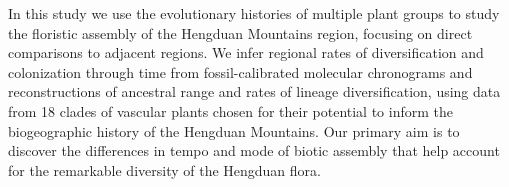 



In this study we use the evolutionary histories of multiple plant groups to study the floristic assembly of the Hengduan Mountains region, focusing on direct comparisons to adjacent regions. We infer regional rates of diversification and colonization through time from fossil-calibrated molecular chronograms and reconstructions of ancestral range and rates of lineage diversification, using data from 18 clades of vascular plants chosen for their potential to inform the biogeographic history of the Hengduan Mountains. Our primary aim is to discover the differences in tempo and mode of biotic assembly that help account for the remarkable diversity of the Hengduan flora.

